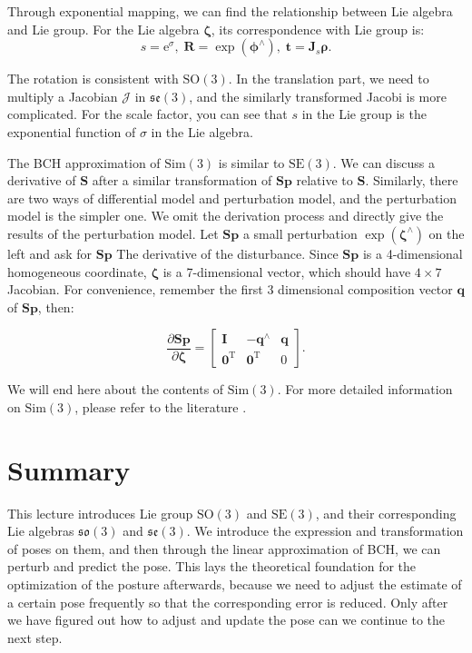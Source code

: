 Through exponential mapping, we can find the relationship between Lie algebra and Lie group. For the Lie algebra $\boldsymbol{\zeta}$, its correspondence with Lie group is:
\begin{equation}
s=\mathrm{e}^\sigma, \; \mathbf{R} = \exp( \boldsymbol{\phi} ^\wedge), \; \mathbf{t} = \mathbf{J}_s \boldsymbol{ \rho}.
\end{equation}

The rotation is consistent with $\mathrm{SO}(3)$. In the translation part, we need to multiply a Jacobian $\boldsymbol{\mathcal{J}}$ in $\mathfrak{se}(3)$, and the similarly transformed Jacobi is more complicated. For the scale factor, you can see that $s$ in the Lie group is the exponential function of $\sigma$ in the Lie algebra.

The BCH approximation of $\mathrm{Sim}(3)$ is similar to $\mathrm{SE}(3)$. We can discuss a derivative of $\mathbf{S}$ after a similar transformation of $\mathbf{S} \mathbf{p}$ relative to $\mathbf{S}$. Similarly, there are two ways of differential model and perturbation model, and the perturbation model is the simpler one. We omit the derivation process and directly give the results of the perturbation model. Let $\mathbf{S} \mathbf{p}$ a small perturbation $\exp( \boldsymbol{\zeta} ^\wedge )$ on the left and ask for $\mathbf{S} \mathbf{p}$ The derivative of the disturbance. Since $\mathbf{S} \mathbf{p}$ is a 4-dimensional homogeneous coordinate, $\boldsymbol{\zeta}$ is a 7-dimensional vector, which should have $4 \times 7$ Jacobian. For convenience, remember the first 3 dimensional composition vector $\mathbf{q}$ of $\mathbf{Sp}$, then:

\begin{equation}
\frac{{\partial \mathbf{Sp}}}{{\partial \boldsymbol{\zeta} }} = \left[ {\begin{array}{*{20}{c}}
    \mathbf{I} &{ - {\mathbf{q}^ \wedge }}& \mathbf{q} \\
    {{\mathbf{0}^\mathrm{T}}} & {{ \mathbf{0}^\mathrm{T}}}&0
    \end{array}} \right].
\end{equation}

We will end here about the contents of $\mathrm{Sim}(3)$. For more detailed information on $\mathrm{Sim}(3)$, please refer to the literature \cite{Strasdat2012a}.

\section{Summary}
This lecture introduces Lie group $\mathrm{SO}(3)$ and $\mathrm{SE}(3)$, and their corresponding Lie algebras $\mathfrak{so}(3)$ and $\mathfrak{se }(3)$. We introduce the expression and transformation of poses on them, and then through the linear approximation of BCH, we can perturb and predict the pose. This lays the theoretical foundation for the optimization of the posture afterwards, because we need to adjust the estimate of a certain pose frequently so that the corresponding error is reduced. Only after we have figured out how to adjust and update the pose can we continue to the next step.

